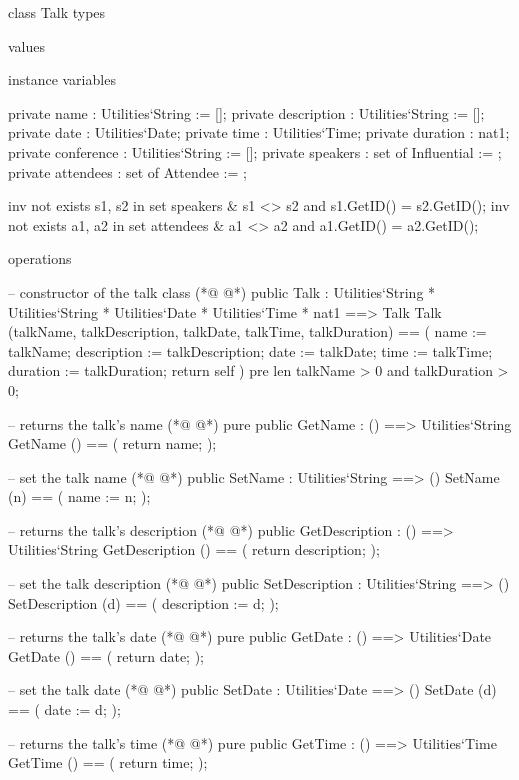 \begin{vdmpp}[breaklines=true]
class Talk
types

values

instance variables

 private name : Utilities`String := [];
 private description : Utilities`String := [];
 private date : Utilities`Date;
 private time : Utilities`Time;
 private duration : nat1;
 private conference : Utilities`String := [];
 private speakers : set of Influential := {};
 private attendees : set of Attendee := {};
 
 inv not exists s1, s2 in set speakers & s1 <> s2 and s1.GetID() = s2.GetID();
 inv not exists a1, a2 in set attendees & a1 <> a2 and a1.GetID() = a2.GetID();
 
operations

 -- constructor of the talk class 
(*@
\label{Talk:23}
@*)
  public Talk :  Utilities`String *  Utilities`String *  Utilities`Date *  Utilities`Time * nat1 ==> Talk
    Talk (talkName, talkDescription, talkDate, talkTime, talkDuration) == (
     name := talkName;
     description := talkDescription;
     date := talkDate;
     time := talkTime;
     duration := talkDuration;
     return self
    )
    pre len talkName > 0 and talkDuration > 0;
    
  -- returns the talk's name
(*@
\label{GetName:35}
@*)
  pure public GetName : () ==> Utilities`String
    GetName () == (
     return name;
    );
    
  -- set the talk name
(*@
\label{SetName:41}
@*)
  public SetName : Utilities`String ==> ()
    SetName (n) == (
     name := n;
    );
    
  -- returns the talk's description
(*@
\label{GetDescription:47}
@*)
  public GetDescription : () ==> Utilities`String
    GetDescription () == (
     return description;
    );
    
  -- set the talk description
(*@
\label{SetDescription:53}
@*)
  public SetDescription : Utilities`String ==> ()
    SetDescription (d) == (
     description := d;
    );
    
  -- returns the talk's date
(*@
\label{GetDate:59}
@*)
  pure public GetDate : () ==> Utilities`Date
    GetDate () == (
     return date;
    );
    
  -- set the talk date
(*@
\label{SetDate:65}
@*)
  public SetDate : Utilities`Date ==> ()
    SetDate (d) == (
     date := d;
    );
    
  -- returns the talk's time
(*@
\label{GetTime:71}
@*)
  pure public GetTime : () ==> Utilities`Time
    GetTime () == (
     return time;
    );
    

\end{vdmpp}
